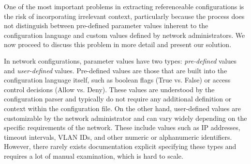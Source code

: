 
One of the most important problems in extracting referenceable configurations
is the risk of incorporating irrelevant context, particularly because the
process does not distinguish between pre-defined parameter values inherent to the configuration language and custom values defined by network administrators. 
We now proceed to discuss this problem in more detail and present our solution.

In network configurations, parameter values have two types: \textit{pre-defined} values and \textit{user-defined} values. Pre-defined values are those that are built into the configuration language itself, such as boolean flags (True vs. False) or access control decisions (Allow vs. Deny). These values are understood by the configuration parser and typically do not require any additional definition or context within the configuration file. On the other hand, user-defined values are customizable by the network administrator and can vary widely depending on the specific requirements of the network. These include values such as IP addresses, timeout intervals, VLAN IDs, and other numeric or alphanumeric identifiers.  However, there rarely exists documentation explicit specifying these types and requires a lot of manual examination, which is hard to scale.

